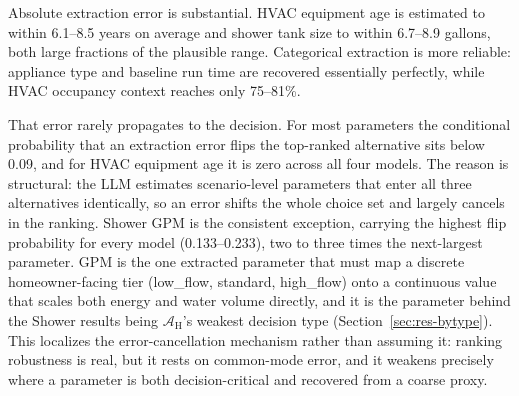 \documentclass[a4paper,fleqn]{cas-dc}
\begin{document}
Absolute extraction error is substantial. HVAC equipment age is estimated to within 6.1--8.5 years on average and shower tank size to within 6.7--8.9 gallons, both large fractions of the plausible range. Categorical extraction is more reliable: appliance type and baseline run time are recovered essentially perfectly, while HVAC occupancy context reaches only 75--81\%.

That error rarely propagates to the decision. For most parameters the conditional probability that an extraction error flips the top-ranked alternative sits below 0.09, and for HVAC equipment age it is zero across all four models. The reason is structural: the LLM estimates scenario-level parameters that enter all three alternatives identically, so an error shifts the whole choice set and largely cancels in the ranking. Shower GPM is the consistent exception, carrying the highest flip probability for every model (0.133--0.233), two to three times the next-largest parameter. GPM is the one extracted parameter that must map a discrete homeowner-facing tier (low\_flow, standard, high\_flow) onto a continuous value that scales both energy and water volume directly, and it is the parameter behind the Shower results being $\mathcal{A}_{\text{H}}$'s weakest decision type (Section~\ref{sec:res-bytype}). This localizes the error-cancellation mechanism rather than assuming it: ranking robustness is real, but it rests on common-mode error, and it weakens precisely where a parameter is both decision-critical and recovered from a coarse proxy.
\end{document}
